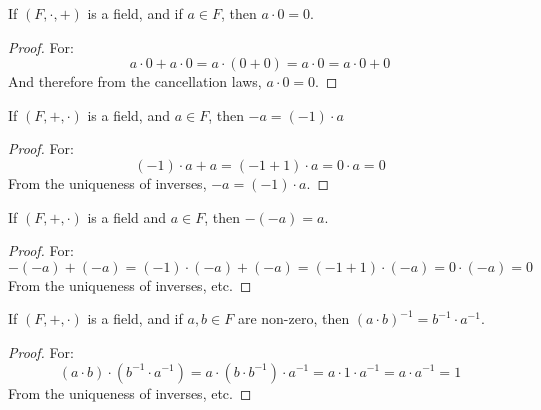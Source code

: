 \documentclass[crop=false,class=book,oneside]{standalone}
\begin{document}
            \begin{theorem}
                If $(F,\cdot,+)$ is a field, and if $a\in{F}$, then
                $a\cdot{0}=0$.
            \end{theorem}
            \begin{proof}
                For:
                \begin{equation}
                    a\cdot{0}+a\cdot{0}=a\cdot(0+0)=
                    a\cdot{0}=a\cdot{0}+0
                \end{equation}
                And therefore from the cancellation laws,
                $a\cdot{0}=0$.
            \end{proof}
            \begin{theorem}
                If $(F,+,\cdot)$ is a field, and $a\in{F}$, then
                $\minus{a}=(\minus{1})\cdot{a}$
            \end{theorem}
            \begin{proof}
                For:
                \begin{equation}
                    (\minus{1})\cdot{a}+a=
                    (\minus{1}+1)\cdot{a}=
                    0\cdot{a}=0
                \end{equation}
                From the uniqueness of inverses,
                $\minus{a}=(\minus{1})\cdot{a}$.
            \end{proof}
            \begin{theorem}
                If $(F,+,\cdot)$ is a field and $a\in{F}$, then
                $\minus(\minus{a})=a$.
            \end{theorem}
            \begin{proof}
                For:
                \begin{equation}
                    \minus(\minus{a})+(\minus{a})=
                    (\minus{1})\cdot(\minus{a})+(\minus{a})
                    =(\minus{1}+1)\cdot(\minus{a})
                    =0\cdot(\minus{a})=0
                \end{equation}
                From the uniqueness of inverses, etc.
            \end{proof}
            \begin{theorem}
                If $(F,+,\cdot)$ is a field, and if $a,b\in{F}$ are
                non-zero, then $(a\cdot{b})^{\minus{1}}=%
                                b^{\minus{1}}\cdot{a}^{\minus{1}}$.
            \end{theorem}
            \begin{proof}
                For:
                \begin{equation}
                    (a\cdot{b})
                    \cdot(b^{\minus{1}}\cdot{a}^{\minus{1}})
                    =a\cdot
                    (b\cdot{b}^{\minus{1}})\cdot{a}^{\minus{1}}
                    =a\cdot{1}\cdot{a}^{\minus{1}}=
                    a\cdot{a}^{\minus{1}}=1
                \end{equation}
                From the uniqueness of inverses, etc.
            \end{proof}
\end{document}
